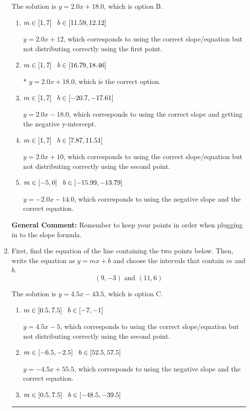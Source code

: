 \documentclass{extbook}[14pt]
\newcommand{\litem}[1]{\item #1

\rule{\textwidth}{0.4pt}}
\begin{document}
\begin{enumerate}
{The solution is \( y = 2.0x + 18.0 \), which is option B.\begin{enumerate}[label=\Alph*.]
\item \( m \in [1, 7] \hspace*{3mm} b \in [11.59, 12.12] \)

 $y = 2.0x + 12$, which corresponds to using the correct slope/equation but not distributing correctly using the first point.
\item \( m \in [1, 7] \hspace*{3mm} b \in [16.79, 18.46] \)

* $y = 2.0x + 18.0$, which is the correct option.
\item \( m \in [1, 7] \hspace*{3mm} b \in [-20.7, -17.61] \)

 $y = 2.0x -18.0$, which corresponds to using the correct slope and getting the negative y-intercept.
\item \( m \in [1, 7] \hspace*{3mm} b \in [7.87, 11.51] \)

 $y = 2.0x + 10$, which corresponds to using the correct slope/equation but not distributing correctly using the second point.
\item \( m \in [-5, 0] \hspace*{3mm} b \in [-15.99, -13.79] \)

 $y = -2.0x -14.0$, which corresponds to using the negative slope and the correct equation.
\end{enumerate}

\textbf{General Comment:} Remember to keep your points in order when plugging in to the slope formula.
}
\litem{
First, find the equation of the line containing the two points below. Then, write the equation as $ y=mx+b $ and choose the intervals that contain $m$ and $b$.
\[ (9, -3) \text{ and } (11, 6) \]

The solution is \( y = 4.5x -43.5 \), which is option C.\begin{enumerate}[label=\Alph*.]
\item \( m \in [0.5, 7.5] \hspace*{3mm} b \in [-7, -1] \)

 $y = 4.5x -5$, which corresponds to using the correct slope/equation but not distributing correctly using the second point.
\item \( m \in [-6.5, -2.5] \hspace*{3mm} b \in [52.5, 57.5] \)

 $y = -4.5x + 55.5$, which corresponds to using the negative slope and the correct equation.
\item \( m \in [0.5, 7.5] \hspace*{3mm} b \in [-48.5, -39.5] \)


\end{enumerate}}
\end{enumerate}
\end{document}
